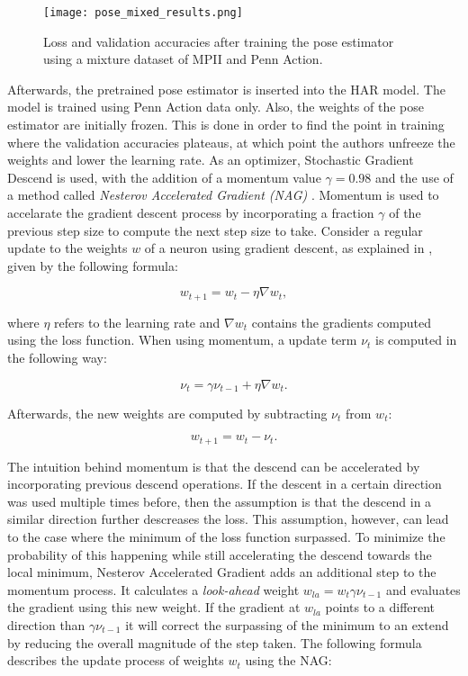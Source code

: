 \begin{figure}[htb!]
    \centering
    \texttt{[image: pose\_mixed\_results.png]}
    \caption{Loss and validation accuracies after training the pose estimator using a mixture dataset of MPII and Penn Action.}
    \label{fig:pose_mixed_results}
\end{figure}

Afterwards, the pretrained pose estimator is inserted into the HAR model.
The model is trained using Penn Action data only.
Also, the weights of the pose estimator are initially frozen.
This is done in order to find the point in training where the validation accuracies plateaus, at which point the authors unfreeze the weights and lower the learning rate.
As an optimizer, Stochastic Gradient Descend is used, with the addition of a momentum value $\gamma = 0.98$ and the use of a method called \textit{Nesterov Accelerated Gradient (NAG)} \cite{nesterov_method_1983}.
Momentum is used to accelarate the gradient descent process by incorporating a fraction $\gamma$ of the previous step size to compute the next step size to take.
Consider a regular update to the weights $w$ of a neuron using gradient descent, as explained in , given by the following formula:

\begin{equation}
    w_{t+1} = w_t - \eta \nabla w_t,
\end{equation}

where $\eta$ refers to the learning rate and $\nabla w_t$ contains the gradients computed using the loss function.
When using momentum, a update term $\nu_t$ is computed in the following way:

\begin{equation}
    \nu_t = \gamma \nu_{t-1} + \eta \nabla w_t.
\end{equation}

Afterwards, the new weights are computed by subtracting $\nu_t$ from $w_t$:

\begin{equation}
    w_{t+1} = w_t - \nu_t.
\end{equation}

The intuition behind momentum is that the descend can be accelerated by incorporating previous descend operations.
If the descent in a certain direction was used multiple times before, then the assumption is that the descend in a similar direction further descreases the loss.
This assumption, however, can lead to the case where the minimum of the loss function surpassed.
To minimize the probability of this happening while still accelerating the descend towards the local minimum, Nesterov Accelerated Gradient adds an additional step to the momentum process.
It calculates a \textit{look-ahead} weight $w_{la} = w_{t} \gamma \nu_{t-1}$ and evaluates the gradient using this new weight.
If the gradient at $w_{la}$ points to a different direction than $\gamma \nu_{t-1}$ it will correct the surpassing of the minimum to an extend by reducing the overall magnitude of the step taken.
The following formula describes the update process of weights $w_t$ using the NAG:

